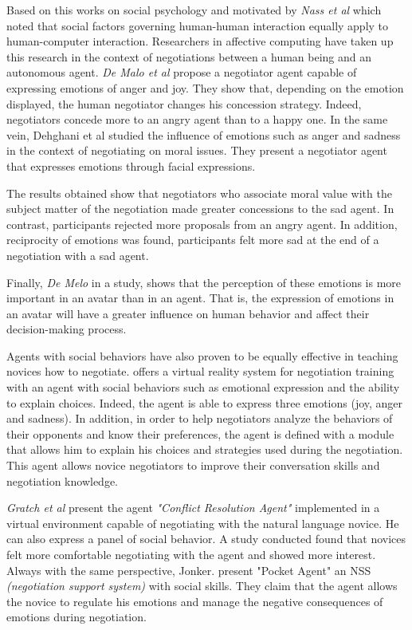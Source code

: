 \documentclass[10pt, a4paper]{article} %
\begin{document}
	  Based on this works on social psychology and motivated by \emph{Nass et al} \cite{nass1994computers} which noted that social factors governing human-human interaction equally apply to human-computer interaction.  Researchers in affective computing have taken up this research in the context of negotiations between a human being and an autonomous agent. \emph{De Malo et al} \cite{de2011effect,de2015humans} propose a negotiator agent capable of expressing emotions of anger and joy. They show that, depending on the emotion displayed, the human negotiator changes his concession strategy. Indeed, negotiators concede more to an angry agent than to a happy one. In the same vein, Dehghani et al \cite{dehghani2014interpersonal} studied the influence of emotions such as anger and sadness in the context of negotiating on moral issues. They present a negotiator agent that expresses emotions through facial expressions.
	 
	 The results obtained show that negotiators who associate moral value with the subject matter of the negotiation made greater concessions to the sad agent. In contrast, participants rejected more proposals from an angry agent. In addition, reciprocity of emotions was found, participants felt more sad at the end of a negotiation with a sad agent.  
	 
	 Finally, \emph{De Melo} \cites{de2015humans} in a study, shows that the perception of these emotions is more important in an avatar than in an agent. That is, the expression of emotions in an avatar will have a greater influence on human behavior and affect their decision-making process.  
	 
	 Agents with social behaviors have also proven to be equally effective in teaching novices how to negotiate. \cite{broekens2012virtual} offers a virtual reality system for negotiation training with an agent with social behaviors such as emotional expression and the ability to explain choices. Indeed, the agent is able to express three emotions (joy, anger and sadness). In addition, in order to help negotiators analyze the behaviors of their opponents and know their preferences, the agent is defined with a module that allows him to explain his choices and strategies used during the negotiation. This agent allows novice negotiators to improve their conversation skills and negotiation knowledge. 
	 
	 \emph{Gratch et al} \cite{gratch2016benefits} present the agent \textit{"Conflict Resolution Agent"} implemented in a virtual environment capable of negotiating with the natural language novice. He can also express a panel of social behavior. A study conducted found that novices felt more comfortable negotiating with the agent and showed more interest. Always with the same perspective, Jonker. \cite{jonker2012negotiating} present "Pocket Agent" an NSS \emph{(negotiation support system)} with social skills. They claim that the agent allows the novice to regulate his emotions and manage the negative consequences of emotions during negotiation.
	 
\end{document}
